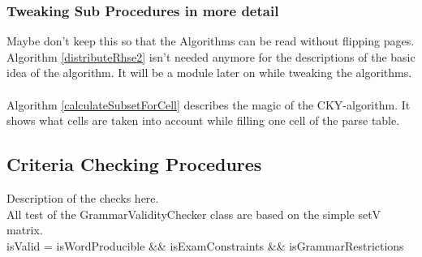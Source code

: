 \pagebreak

\subsubsection{Tweaking Sub Procedures in more detail}
Maybe don't keep this so that the Algorithms can be read without flipping pages.\\

\noindent
{}
Algorithm \ref{distributeRhse2} isn't needed anymore for the descriptions of the basic idea of the algorithm. It will be a module later on while tweaking the algorithms.
\\
\\
Algorithm \ref{calculateSubsetForCell} describes the magic of the CKY-algorithm. It shows what cells are taken into account while filling one cell of the parse table.

\pagebreak

\subsection{Criteria Checking Procedures}
\noindent Description of the checks here. \\
\noindent All test of the GrammarValidityChecker class are based on the simple setV matrix. \\

\noindent  isValid = isWordProducible \&\& isExamConstraints \&\& isGrammarRestrictions\\

